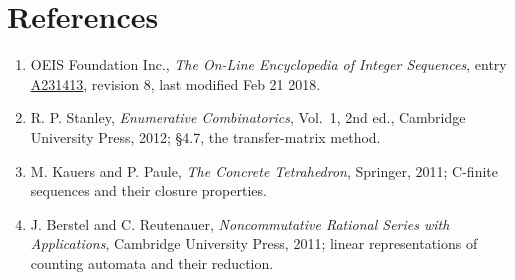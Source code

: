 \documentclass[11pt]{article}
\theoremstyle{definition}
\begin{document}
\section{References}

\begin{enumerate}

\item OEIS Foundation Inc., \emph{The On-Line Encyclopedia of Integer Sequences}, entry \href{https://oeis.org/A231413}{A231413}, revision 8, last modified Feb 21 2018.

\item R. P. Stanley, \emph{Enumerative Combinatorics}, Vol.~1, 2nd ed., Cambridge University Press, 2012; \S4.7, the transfer-matrix method.

\item M. Kauers and P. Paule, \emph{The Concrete Tetrahedron}, Springer, 2011; C-finite sequences and their closure properties.

\item J. Berstel and C. Reutenauer, \emph{Noncommutative Rational Series with Applications}, Cambridge University Press, 2011; linear representations of counting automata and their reduction.

\end{enumerate}
\end{document}
